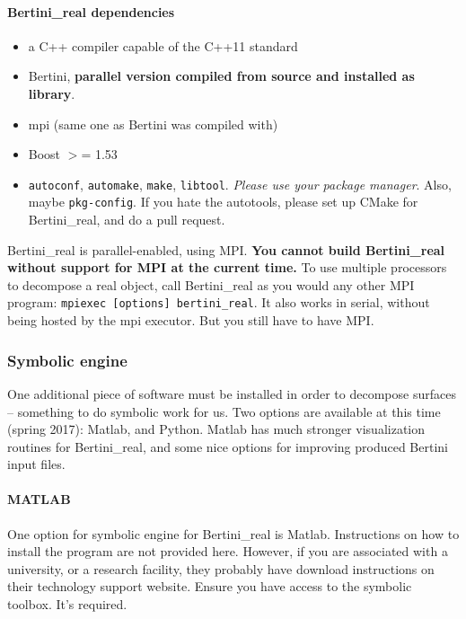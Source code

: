 \paragraph{Bertini\_real dependencies}

\begin{itemize}[noitemsep]
\item a C++ compiler capable of the C++11 standard
\item Bertini, {\bf parallel version compiled from source and installed as library}.
\item \gls{mpi} (same one as Bertini was compiled with)
\item Boost $>$= 1.53
\item {\tt autoconf}, {\tt automake}, {\tt make}, {\tt libtool}.  {\em Please use your package manager}.  Also, maybe {\tt pkg-config}.  If you hate the autotools, please set up CMake for Bertini\_real, and do a pull request.
\end{itemize} 



Bertini\_real is parallel-enabled, using MPI.  {\bf You cannot build Bertini\_real without support for MPI at the current time.}  To use multiple processors to decompose a real object, call Bertini\_real as you would any other MPI program: \texttt{mpiexec [options] bertini\_real}.  It also works in serial, without being hosted by the mpi executor.  But you still have to have MPI.  


\subsubsection{Symbolic engine}

One additional piece of software must be installed in order to decompose surfaces -- something to do symbolic work for us.  Two options are available at this time (spring 2017):  Matlab, and Python.  Matlab has much stronger visualization routines for Bertini\_real, and some nice options for improving produced Bertini input files.

	\paragraph*{MATLAB}
One option for symbolic engine for Bertini\_real is Matlab.  Instructions on how to install the program are not provided here. However, if you are associated with a university, or a research facility, they probably have download instructions on their technology support website.   Ensure you have access to the symbolic toolbox.  It's required.

